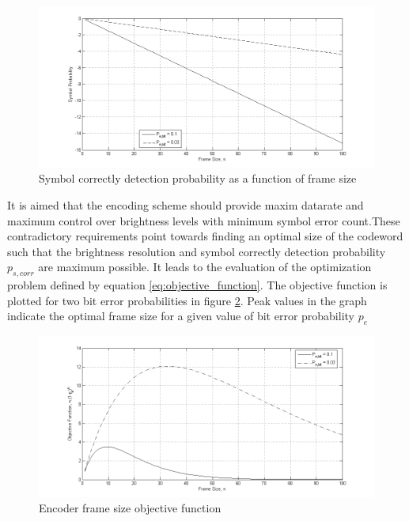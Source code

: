 \begin{figure}[h]
	\centering
	\includegraphics[width=\textwidth]{./Figures/SymbolVsn.png}
	\caption[Symbol correctly decoding probablity]{Symbol correctly detection probability as a function of frame size}
	\label{fig:symbol_error}
\end{figure}

It is aimed that the encoding scheme should provide maxim datarate and maximum control over brightness levels with minimum symbol error count.These contradictory requirements point towards finding an optimal size of the codeword such that the brightness resolution and symbol correctly detection probability $p_{s,corr}$ are maximum possible. It leads to the evaluation of the optimization problem defined by equation \ref{eq:objective_function}. The objective function is plotted for two bit error probabilities in figure \ref{fig:objective_function}. Peak values in the graph indicate the optimal frame size for a given value of bit error probability $p_e$

\begin{figure}
	\centering
	\includegraphics[width=\textwidth]{./Figures/ObjectiveFunction.png}
	\caption{Encoder frame size objective function}
	\label{fig:objective_function}
\end{figure}

